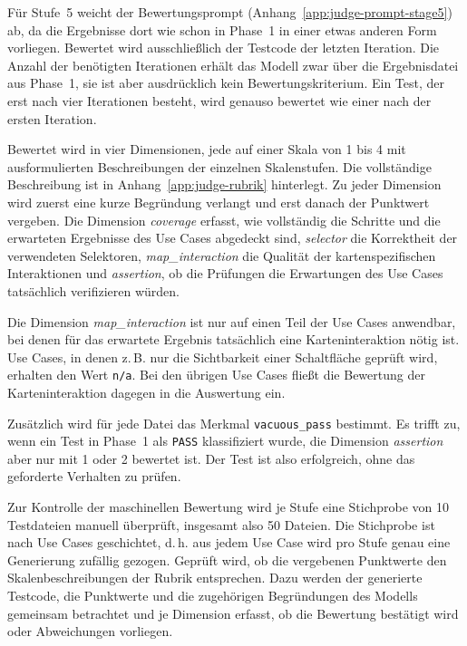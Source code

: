 Für Stufe~5 weicht der Bewertungsprompt (Anhang~\ref{app:judge-prompt-stage5}) ab, da die Ergebnisse dort wie schon in Phase~1 in einer etwas anderen Form vorliegen. Bewertet wird ausschließlich der Testcode der letzten Iteration. Die Anzahl der benötigten Iterationen erhält das Modell zwar über die Ergebnisdatei aus Phase~1, sie ist aber ausdrücklich kein Bewertungskriterium. Ein Test, der erst nach vier Iterationen besteht, wird genauso bewertet wie einer nach der ersten Iteration.

Bewertet wird in vier Dimensionen, jede auf einer Skala von 1 bis 4 mit ausformulierten Beschreibungen der einzelnen Skalenstufen. Die vollständige Beschreibung ist in Anhang~\ref{app:judge-rubrik} hinterlegt. Zu jeder Dimension wird zuerst eine kurze Begründung verlangt und erst danach der Punktwert vergeben. Die Dimension \emph{coverage} erfasst, wie vollständig die Schritte und die erwarteten Ergebnisse des Use Cases abgedeckt sind, \emph{selector} die Korrektheit der verwendeten Selektoren, \emph{map\_interaction} die Qualität der kartenspezifischen Interaktionen und \emph{assertion}, ob die Prüfungen die Erwartungen des Use Cases tatsächlich verifizieren würden.

Die Dimension \emph{map\_interaction} ist nur auf einen Teil der Use Cases anwendbar, bei denen für das erwartete Ergebnis tatsächlich eine Karteninteraktion nötig ist. Use Cases, in denen z.\,B. nur die Sichtbarkeit einer Schaltfläche geprüft wird, erhalten den Wert \texttt{n/a}. Bei den übrigen Use Cases fließt die Bewertung der Karteninteraktion dagegen in die Auswertung ein.

Zusätzlich wird für jede Datei das Merkmal \texttt{vacuous\_pass} bestimmt. Es trifft zu, wenn ein Test in Phase~1 als \texttt{PASS} klassifiziert wurde, die Dimension \emph{assertion} aber nur mit 1 oder 2 bewertet ist. Der Test ist also erfolgreich, ohne das geforderte Verhalten zu prüfen.

Zur Kontrolle der maschinellen Bewertung wird je Stufe eine Stichprobe von 10 Testdateien manuell überprüft, insgesamt also 50 Dateien. Die Stichprobe ist nach Use Cases geschichtet, d.\,h. aus jedem Use Case wird pro Stufe genau eine Generierung zufällig gezogen. Geprüft wird, ob die vergebenen Punktwerte den Skalenbeschreibungen der Rubrik entsprechen. Dazu werden der generierte Testcode, die Punktwerte und die zugehörigen Begründungen des Modells gemeinsam betrachtet und je Dimension erfasst, ob die Bewertung bestätigt wird oder Abweichungen vorliegen.